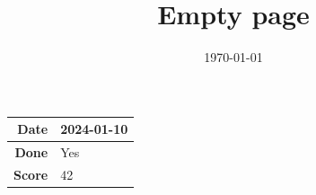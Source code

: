 \documentclass[11pt,a4paper]{article}
\title{Empty page}
\author{}
\date{\today}
\begin{document}
\maketitle

\begin{center}
\begin{tabular}{|r|l|}
  \hline
  \textbf{Date} & 2024-01-10 \\
  \hline
  \textbf{Done} & Yes \\
  \hline
  \textbf{Score} & 42 \\
  \hline
\end{tabular}
\end{center}
\medskip
\end{document}

